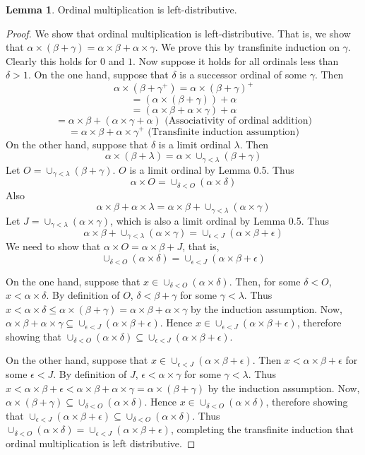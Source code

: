 \documentclass{article}
\theoremstyle{definition}
\newtheorem{lemma}[theorem]{Lemma}
\begin{document}
\begin{lemma}
Ordinal multiplication is left-distributive.
\end{lemma}
\begin{proof}
We show that ordinal multiplication is left-distributive. That is, we show that
$\alpha\times(\beta+\gamma)=\alpha\times\beta+\alpha\times\gamma$. We prove this by transfinite induction on
$\gamma$. Clearly this holds for $0$ and $1$. Now suppose it holds for all ordinals less than $\delta>1$. On the one hand, suppose that
$\delta$ is a successor ordinal of some $\gamma$. Then
\[ \alpha\times(\beta+\gamma^+)=\alpha\times(\beta+\gamma)^+ \]
\[ =(\alpha\times(\beta+\gamma))+\alpha \]
\[ =(\alpha\times\beta+\alpha\times\gamma)+\alpha \]
\[ =\alpha\times\beta+(\alpha\times\gamma+\alpha)\textrm{ (Associativity of ordinal addition)} \]
\[ =\alpha\times\beta+\alpha\times\gamma^+\textrm{ (Transfinite induction assumption)} \]
On the other hand, suppose that $\delta$ is a limit ordinal $\lambda$. Then
\[ \alpha\times(\beta+\lambda)=\alpha\times\cup_{\gamma<\lambda}(\beta+\gamma) \]
Let $O=\cup_{\gamma<\lambda}(\beta+\gamma)$. $O$ is a limit ordinal by Lemma 0.5. Thus
\[ \alpha\times O=\cup_{\delta<O}(\alpha\times\delta) \]
Also
\[ \alpha\times\beta+\alpha\times\lambda=\alpha\times\beta+\cup_{\gamma<\lambda}(\alpha\times\gamma) \]
Let $J=\cup_{\gamma<\lambda}(\alpha\times\gamma)$, which is also a limit ordinal by Lemma 0.5. Thus
\[ \alpha\times\beta+\cup_{\gamma<\lambda}(\alpha\times\gamma)=\cup_{\epsilon<J}(\alpha\times\beta+\epsilon) \]
We need to show that $\alpha\times O=\alpha\times\beta+J$, that is,
\[ \cup_{\delta<O}(\alpha\times\delta)=\cup_{\epsilon<J}(\alpha\times\beta+\epsilon) \]

On the one hand, suppose that $x\in\cup_{\delta<O}(\alpha\times\delta)$. Then, for some
$\delta<O$, $x<\alpha\times\delta$. By definition of $O$, $\delta<\beta+\gamma$ for some $\gamma<\lambda$. Thus
$x<\alpha\times\delta\le\alpha\times(\beta+\gamma)=\alpha\times\beta+\alpha\times\gamma$ by the induction assumption.
Now, $\alpha\times\beta+\alpha\times\gamma\subseteq\cup_{\epsilon<J}(\alpha\times\beta+\epsilon)$. Hence
$x\in\cup_{\epsilon<J}(\alpha\times\beta+\epsilon)$, therefore showing that
$\cup_{\delta<O}(\alpha\times\delta)\subseteq\cup_{\epsilon<J}(\alpha\times\beta+\epsilon)$.

On the other hand, suppose that $x\in\cup_{\epsilon<J}(\alpha\times\beta+\epsilon)$.
Then $x<\alpha\times\beta+\epsilon$ for some $\epsilon<J$. By definition of $J$,
$\epsilon<\alpha\times\gamma$ for some $\gamma<\lambda$.
Thus $x<\alpha\times\beta+\epsilon<\alpha\times\beta+\alpha\times\gamma=\alpha\times(\beta+\gamma)$ by the induction assumption.
Now, $\alpha\times(\beta+\gamma)\subseteq\cup_{\delta<O}(\alpha\times\delta)$. Hence
$x\in\cup_{\delta<O}(\alpha\times\delta)$, therefore showing that
$\cup_{\epsilon<J}(\alpha\times\beta+\epsilon)\subseteq\cup_{\delta<O}(\alpha\times\delta)$.
Thus $\cup_{\delta<O}(\alpha\times\delta)=\cup_{\epsilon<J}(\alpha\times\beta+\epsilon)$, completing the transfinite induction
that ordinal multiplication is left distributive.
\end{proof}
\end{document}
